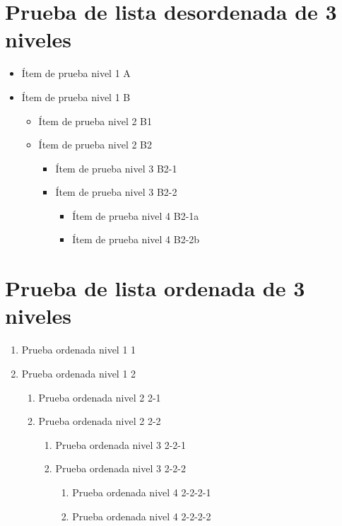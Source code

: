 \documentclass[es]{../../elegantbook}
\begin{document}
\section{Prueba de lista desordenada de 3 niveles}
\begin{itemize}
\item Ítem de prueba nivel 1 A
\item Ítem de prueba nivel 1 B
    \begin{itemize}
    \item Ítem de prueba nivel 2 B1
    \item Ítem de prueba nivel 2 B2
        \begin{itemize}
        \item Ítem de prueba nivel 3 B2-1
        \item Ítem de prueba nivel 3 B2-2
            \begin{itemize}
            \item Ítem de prueba nivel 4 B2-1a
            \item Ítem de prueba nivel 4 B2-2b
            \end{itemize}
        \end{itemize}
    \end{itemize}
\end{itemize}

\section{Prueba de lista ordenada de 3 niveles}
\begin{enumerate}
\item Prueba ordenada nivel 1 1
\item Prueba ordenada nivel 1 2
    \begin{enumerate}
    \item Prueba ordenada nivel 2 2-1
    \item Prueba ordenada nivel 2 2-2
        \begin{enumerate}
        \item Prueba ordenada nivel 3 2-2-1
        \item Prueba ordenada nivel 3 2-2-2
            \begin{enumerate}
            \item Prueba ordenada nivel 4 2-2-2-1
            \item Prueba ordenada nivel 4 2-2-2-2
            \end{enumerate}
        \end{enumerate}
    \end{enumerate}
\end{enumerate}
\end{document}
